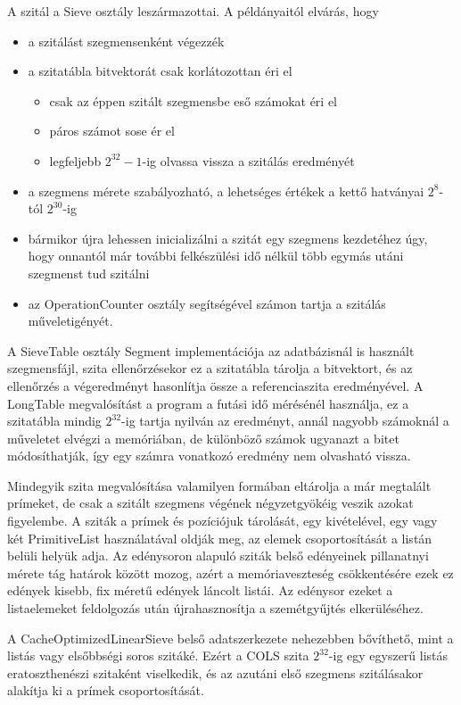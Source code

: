 A szitál a Sieve osztály leszármazottai.
A példányaitól elvárás, hogy
\begin{itemize}
\item a szitálást szegmensenként végezzék
\item a szitatábla bitvektorát csak korlátozottan éri el
\begin{itemize}
\item csak az éppen szitált szegmensbe eső számokat éri el
\item páros számot sose ér el
\item legfeljebb $2^{32}-1$-ig olvassa vissza a szitálás eredményét
\end{itemize}
\item a szegmens mérete szabályozható, a lehetséges értékek a kettő hatványai $2^8$-tól $2^{30}$-ig 
\item bármikor újra lehessen inicializálni a szitát egy szegmens kezdetéhez úgy, hogy onnantól már további felkészülési idő nélkül több egymás utáni szegmenst tud szitálni
\item az OperationCounter osztály segítségével számon tartja a szitálás műveletigényét.
\end{itemize}

A SieveTable osztály Segment implementációja az adatbázisnál is használt szegmensfájl, szita ellenőrzésekor ez a szitatábla tárolja a bitvektort, és az ellenőrzés a végeredményt hasonlítja össze a referenciaszita eredményével.
A LongTable megvalósítást a program a futási idő mérésénél használja, ez a szitatábla mindig $2^{32}$-ig tartja nyilván az eredményt, annál nagyobb számoknál a műveletet elvégzi a memóriában, de különböző számok ugyanazt a bitet módosíthatják, így egy számra vonatkozó eredmény nem olvasható vissza.

Mindegyik szita megvalósítása valamilyen formában eltárolja a már megtalált prímeket, de csak a szitált szegmens végének négyzetgyökéig veszik azokat figyelembe.
A sziták a prímek és pozíciójuk tárolását, egy kivételével, egy vagy két PrimitiveList használatával oldják meg, az elemek csoportosítását a listán belüli helyük adja.
Az edénysoron alapuló sziták belső edényeinek pillanatnyi mérete tág határok között mozog, azért a memóriaveszteség csökkentésére ezek ez edények kisebb, fix méretű edények láncolt listái.
Az edénysor ezeket a listaelemeket feldolgozás után újrahasznosítja a szemétgyűjtés elkerüléséhez.

A CacheOptimizedLinearSieve belső adatszerkezete nehezebben bővíthető, mint a listás vagy elsőbbségi soros szitáké.
Ezért a COLS szita $2^{32}$-ig egy egyszerű listás eratoszthenészi szitaként viselkedik, és az azutáni első szegmens szitálásakor alakítja ki a prímek csoportosítását.

